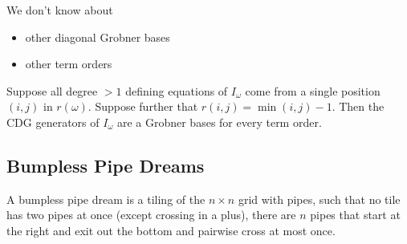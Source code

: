 \begin{remark}
    We don't know about
    \begin{itemize}
        \item other diagonal Grobner bases
        \item other term orders
    \end{itemize}
\end{remark}

\begin{proposition}
    Suppose all degree $>1$ defining equations of $I_\omega$ come from a single position $(i,j)$ in $r(\omega)$. Suppose further that $r(i,j) = \min (i,j) - 1$. Then the CDG generators of $I_\omega$ are a Grobner bases for every term order.
\end{proposition}

\subsection{Bumpless Pipe Dreams}

\begin{definition}
    A bumpless pipe dream is a tiling of the $n \times n$ grid with pipes, such that no tile has two pipes at once (except crossing in a plus), there are $n$ pipes that start at the right and exit out the bottom and pairwise cross at most once.
\end{definition}

